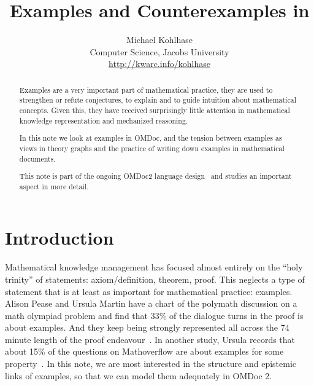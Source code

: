 \documentclass[11pt]{bluenote}
\title{Examples and Counterexamples in \omdoc}
\author{Michael Kohlhase\\Computer Science,  Jacobs University\\\url{http://kwarc.info/kohlhase}}
\def\omdoc{OMDoc\xspace}
\def\omdocv#1{OMDoc#1\xspace}
\def\omdoc{OMDoc\xspace}
\begin{document}
\maketitle
\begin{abstract}
  Examples are a very important part of mathematical practice, they are used to strengthen
  or refute conjectures, to explain and to guide intuition about mathematical
  concepts. Given this, they have received surprisingly little attention in mathematical
  knowledge representation and mechanized reasoning. 

  In this note we look at examples in \omdoc, and the tension between examples as views in
  theory graphs and the practice of writing down examples in mathematical documents.

  This note is part of the ongoing \omdocv2 language design~\cite{Kohlhase:old13} and
  studies an important aspect in more detail.
\end{abstract}
\newpage\tableofcontents\newpage

\section{Introduction}

Mathematical knowledge management has focused almost entirely on the ``holy trinity'' of
statements: axiom/definition, theorem, proof. This neglects a type of statement that is at
least as important for mathematical practice: examples.  Alison Pease and Ursula Martin
have a chart of the polymath discussion on a math olympiad problem and find that 33\% of
the dialogue turns in the proof is about examples. And they keep being strongly
represented all across the 74 minute length of the proof
endeavour~\cite{PeaMar:sfmm12}. In another study, Ursula records that about 15\% of the
questions on Mathoverflow are about examples for some property~\cite{MarPea:wmtapm13}. In
this note, we are most interested in the structure and epistemic links of examples, so
that we can model them adequately in \omdoc2.
\end{document}
